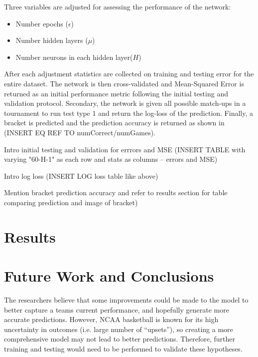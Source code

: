 \documentclass[conference]{IEEEtran}
\begin{document}
Three variables are adjusted for assessing the performance of the network:
\begin{itemize}
\item Number epochs ($\epsilon$)
\item Number hidden layers ($\mu$)
\item Number neurons in each hidden layer($H$)
\end{itemize}

After each adjustment statistics are collected on training and testing error for the entire dataset.
The network is then cross-validated and Mean-Squared Error is returned as an initial performance metric following the initial testing and validation protocol.
Secondary, the network is given all possible match-ups in a tournament to run test type 1 and return the log-loss of the prediction.
Finally, a bracket is predicted and the prediction accuracy is returned as shown in (INSERT EQ REF TO numCorrect/numGames).

Intro initial testing and validation for errrors and MSE
(INSERT TABLE with varying "60-H-1" as each row and stats as columns -- errors and MSE)

Intro log loss 
(INSERT LOG loss table like above)

Mention bracket prediction accuracy and refer to results section for table comparing prediction and image of bracket)
\section{Results}

\section{Future Work and Conclusions}
%

The researchers believe that some improvements could be made to the model to better capture a teams current performance, and hopefully generate more accurate predictions. However, NCAA basketball is known for its high uncertainty in outcomes (i.e. large number of ``upsets''), so creating a more comprehensive model may not lead to better predictions. Therefore, further training and testing would need to be performed to validate these hypotheses.
\end{document}
